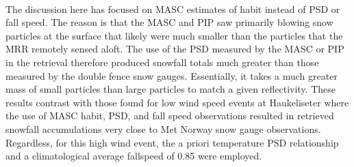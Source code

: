 \\
The discussion here has focused on MASC estimates of habit instead of PSD or fall speed. The reason is that the MASC and PIP saw primarily blowing snow particles at the surface that likely were much smaller than the particles that the MRR remotely sensed aloft.  The use of the PSD measured by the MASC or PIP in the retrieval therefore produced snowfall totals much greater than those measured by the double fence snow gauges.  Essentially, it takes a much greater mass of small particles than large particles to match a given reflectivity. These results contrast with those found for low wind speed events at Haukeliseter where the use of MASC habit, PSD, and fall speed observations resulted in retrieved snowfall accumulations very close to Met Norway snow gauge observations.  Regardless, for this high wind event, the \citet{wood_estimation_2011} a priori temperature PSD relationship and a climatological average fallspeed of \SI{0.85}{\mPs} \citep[private communication,][]{Priv_Comm_Schirle} were employed.




